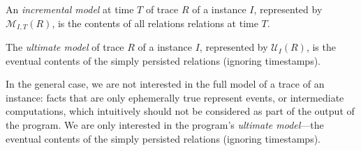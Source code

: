\begin{definition}
%
An {\em incremental model} at time $T$ of trace $R$ of a \lang instance $I$,
represented by $\mathcal{M}_{I,T}(R)$, is the contents of all relations
relations at time $T$.
%
\end{definition}

\begin{definition}
%
The {\em ultimate model} of trace $R$ of a \lang instance $I$, represented by
$\mathcal{U}_I(R)$, is the eventual contents of the simply persisted relations
(ignoring timestamps).
%
\end{definition}

In the general case, we are not interested in the full model of a trace of an
instance: facts that are only ephemerally true represent events, or intermediate
computations, which intuitively should not be considered as part of the output
of the program.  We are only interested in the program's {\em ultimate
  model}---the eventual contents of the simply persisted relations (ignoring
timestamps).

